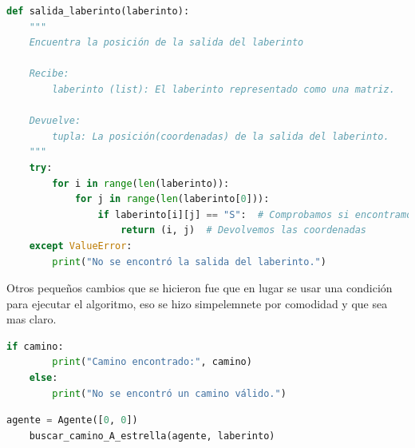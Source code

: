 \begin{lstlisting}[language=Python, caption=Función auxiliar: salida_laberinto]
    def salida_laberinto(laberinto):
    """
    Encuentra la posición de la salida del laberinto

    Recibe:
        laberinto (list): El laberinto representado como una matriz.

    Devuelve:
        tupla: La posición(coordenadas) de la salida del laberinto.
    """
    try:
        for i in range(len(laberinto)):
            for j in range(len(laberinto[0])):
                if laberinto[i][j] == "S":  # Comprobamos si encontramos la salida
                    return (i, j)  # Devolvemos las coordenadas 
    except ValueError:
        print("No se encontró la salida del laberinto.")
\end{lstlisting}

Otros pequeños cambios que se hicieron fue que en lugar se usar una condición para ejecutar el algoritmo, eso se hizo simpelemnete por comodidad y que sea mas claro.

\begin{lstlisting}[language=Python, caption=Versión 1: ejecución algoritmo]
	if camino:
    	print("Camino encontrado:", camino)
	else:
    	print("No se encontró un camino válido.")
\end{lstlisting}

\begin{lstlisting}[language=Python, caption=Versión 2: ejecución algoritmo]
	agente = Agente([0, 0])
	buscar_camino_A_estrella(agente, laberinto)
\end{lstlisting}

